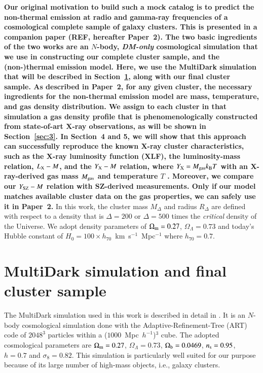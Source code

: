 \documentclass[useAMS,usenatbib]{mn2e}
\begin{document}
{\bf Our original motivation to build such a mock catalog is to predict the 
non-thermal emission at radio and gamma-ray frequencies of a cosmological 
complete sample of galaxy clusters. This is presented in a companion 
paper (REF, hereafter Paper~2).
The two basic ingredients of the two works are an $N$-body, \emph{DM-only}
cosmological simulation that we use in constructing our complete cluster sample,
and the (non-)thermal emission model. Here, we use the MultiDark simulation that
will be described in Section~\ref{sec:2}, along with our final cluster sample. As described 
in Paper~2, for any given cluster, the necessary ingredients for the non-thermal emission 
model are mass, temperature, and gas density distribution. We assign to
each cluster in that simulation a gas density profile that is phenomenologically
constructed from state-of-art X-ray observations, as will be shown in
Section~\ref{sec:3}. In Section~4 and 5, we will show that this approach can successfully
reproduce the known X-ray cluster characteristics, such as the X-ray luminosity
function (XLF), the luminosity-mass relation, $L_{{\mathrm{X}}}- M$, and the
$Y_{{\mathrm{X}}}-M$ relation, where $Y_{{\mathrm{X}}}=M_{\mathrm{gas}}k_{{\mathrm{B}}}T$ with an
X-ray-derived gas mass $M_{{\mathrm{gas}}}$ and temperature $T$
\citep{2006ApJ...650..128K}. Moreover, we compare our $Y_{{\mathrm{SZ}}}-M$ relation
with SZ-derived measurements. Only if our model matches available cluster data
on the gas properties, we can safely use it in Paper~2.} In this work, the cluster mass $M_{\Delta}$ 
and radius $R_{\Delta}$ are defined with respect to a density that is $\Delta=200$ or 
$\Delta=500$ times the \emph{critical} density of the Universe. We adopt density 
parameters of $\Omega_{{\mathrm{m}}}=0.27$, $\Omega_{\Lambda}=0.73$ and today's 
Hubble constant of $H_0 = 100 \times h_{70}$~km~s$^{-1}$~Mpc$^{-1}$ where $h_{70} = 0.7$.


\section{MultiDark simulation and final cluster sample}
\label{sec:2}
The MultiDark simulation used in this work is described in detail in \cite{2011arXiv1104.5130P}.  
It is an $N$-body cosmological simulation done with the Adaptive-Refinement-Tree (ART) 
code \citep{1997ApJS..111...73K} of $2048^3$ particles within a ($1000$~Mpc~$h^{-1}$)$^3$ 
cube. The adopted cosmological parameters are $\Omega_{{\mathrm{m}}}=0.27$, $\Omega_{\Lambda}=0.73$,
$\Omega_{\mathrm{b}}=0.0469$, $n_{\mathrm{s}}=0.95$, $h=0.7$ and $\sigma_8=0.82$. This simulation is 
particularly well suited for our purpose because of its large 
number of high-mass objects, i.e., galaxy clusters.
 
\end{document}
